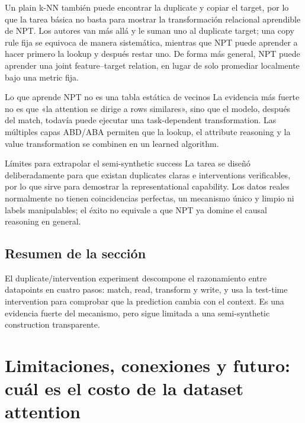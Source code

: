 \documentclass[a4paper]{article}
\begin{document}
Un plain k-NN también puede encontrar la duplicate y copiar el target, por lo que la tarea básica no basta para mostrar la transformación relacional aprendible de NPT. Los autores van más allá y le suman uno al duplicate target; una copy rule fija se equivoca de manera sistemática, mientras que NPT puede aprender a hacer primero la lookup y después restar uno. De forma más general, NPT puede aprender una joint feature--target relation, en lugar de solo promediar localmente bajo una metric fija.

\begin{importantbox}{Lo que aprende NPT no es una tabla estática de vecinos}
La evidencia más fuerte no es que «la attention se dirige a rows similares», sino que el modelo, después del match, todavía puede ejecutar una task-dependent transformation. Las múltiples capas ABD/ABA permiten que la lookup, el attribute reasoning y la value transformation se combinen en un learned algorithm.
\end{importantbox}


\begin{warningbox}{Límites para extrapolar el semi-synthetic success}
La tarea se diseñó deliberadamente para que existan duplicates claras e interventions verificables, por lo que sirve para demostrar la representational capability. Los datos reales normalmente no tienen coincidencias perfectas, un mecanismo único y limpio ni labels manipulables; el éxito no equivale a que NPT ya domine el causal reasoning en general.
\end{warningbox}

\subsection{Resumen de la sección}

El duplicate/intervention experiment descompone el razonamiento entre datapoints en cuatro pasos: match, read, transform y write, y usa la test-time intervention para comprobar que la prediction cambia con el context. Es una evidencia fuerte del mecanismo, pero sigue limitada a una semi-synthetic construction transparente.
\section{Limitaciones, conexiones y futuro: cuál es el costo de la dataset attention}
\end{document}

